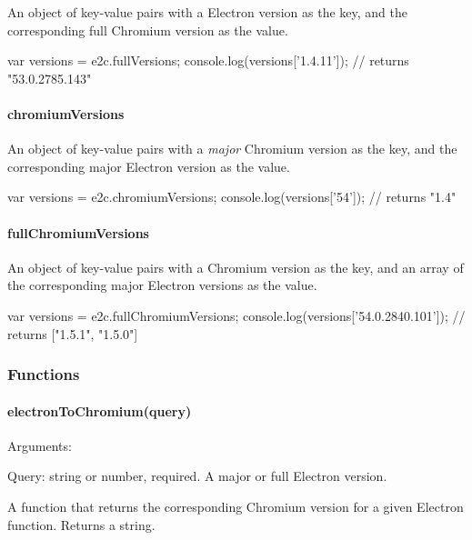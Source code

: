 An object of key-\/value pairs with a Electron version as the key, and the corresponding full Chromium version as the value.


\begin{DoxyCode}
var versions = e2c.fullVersions;
console.log(versions['1.4.11']);
// returns "53.0.2785.143"
\end{DoxyCode}


\paragraph*{{\ttfamily chromium\+Versions}}

An object of key-\/value pairs with a {\itshape major} Chromium version as the key, and the corresponding major Electron version as the value.


\begin{DoxyCode}
var versions = e2c.chromiumVersions;
console.log(versions['54']);
// returns "1.4"
\end{DoxyCode}


\paragraph*{{\ttfamily full\+Chromium\+Versions}}

An object of key-\/value pairs with a Chromium version as the key, and an array of the corresponding major Electron versions as the value.


\begin{DoxyCode}
var versions = e2c.fullChromiumVersions;
console.log(versions['54.0.2840.101']);
// returns ["1.5.1", "1.5.0"]
\end{DoxyCode}
 \subsubsection*{Functions}

\paragraph*{{\ttfamily electron\+To\+Chromium(query)}}

Arguments\+:
\begin{DoxyItemize}
\item Query\+: string or number, required. A major or full Electron version.
\end{DoxyItemize}

A function that returns the corresponding Chromium version for a given Electron function. Returns a string.


